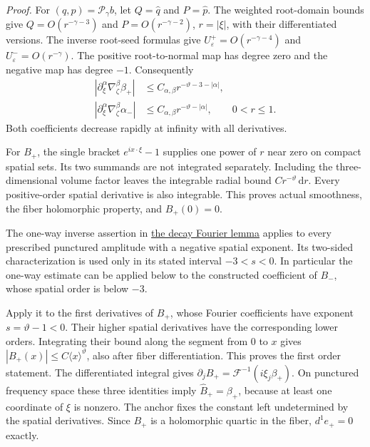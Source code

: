 \documentclass[
  english,
  11pt,
  reqno]{amsart}
\begin{document}
\emph{Proof.} For \((q,p)=\mathscr P_\gamma b\), let \(Q=\widehat q\)
and \(P=\widehat p\). The weighted root-domain bounds give
\(Q=O(r^{-\gamma-3})\) and \(P=O(r^{-\gamma-2})\), \(r=|\xi|\), with
their differentiated versions. The inverse root-seed formulas give
\(U^+_\varepsilon=O(r^{-\gamma-4})\) and
\(U^-_\varepsilon=O(r^{-\gamma})\). The positive root-to-normal map has
degree zero and the negative map has degree \(-1\). Consequently%
\[
\begin{aligned}
|\partial_\xi^\alpha\nabla_\zeta^\beta\beta_+|
&\le C_{\alpha,\beta}r^{-\vartheta-3-|\alpha|},\\
|\partial_\xi^\alpha\nabla_\zeta^\beta\alpha_-|
&\le C_{\alpha,\beta}r^{-\vartheta-|\alpha|},
\qquad 0<r\le1.
\end{aligned}
\] Both coefficients decrease rapidly at infinity with all derivatives.

For \(B_+\), the single bracket \(e^{ix\cdot\xi}-1\) supplies one power
of \(r\) near zero on compact spatial sets. Its two summands are not
integrated separately. Including the three-dimensional volume factor
leaves the integrable radial bound \(Cr^{-\vartheta}\,\mathrm dr\).
Every positive-order spatial derivative is also integrable. This proves
actual smoothness, the fiber holomorphic property, and \(B_+(0)=0\).

The one-way inverse assertion in
\hyperref[lem:online-decay-fourier-isomorphism]{the decay Fourier lemma}
applies to every prescribed punctured amplitude with a negative spatial
exponent. Its two-sided characterization is used only in its stated
interval \(-3<s<0\). In particular the one-way estimate can be applied
below to the constructed coefficient of \(B_-\), whose spatial order is
below \(-3\).

Apply it to the first derivatives of \(B_+\), whose Fourier coefficients
have exponent \(s=\vartheta-1<0\). Their higher spatial derivatives have
the corresponding lower orders. Integrating their bound along the
segment from \(0\) to \(x\) gives
\(|B_+(x)|\le C\langle x\rangle^{\vartheta}\), also after fiber
differentiation. This proves the first order statement. The
differentiated integral gives
\(\partial_jB_+=\mathcal F^{-1}(i\xi_j\beta_+)\). On punctured frequency
space these three identities imply \(\widehat B_+=\beta_+\), because at
least one coordinate of \(\xi\) is nonzero. The anchor fixes the
constant left undetermined by the spatial derivatives. Since \(B_+\) is
a holomorphic quartic in the fiber, \(d^1e_+=0\) exactly.
\end{document}
